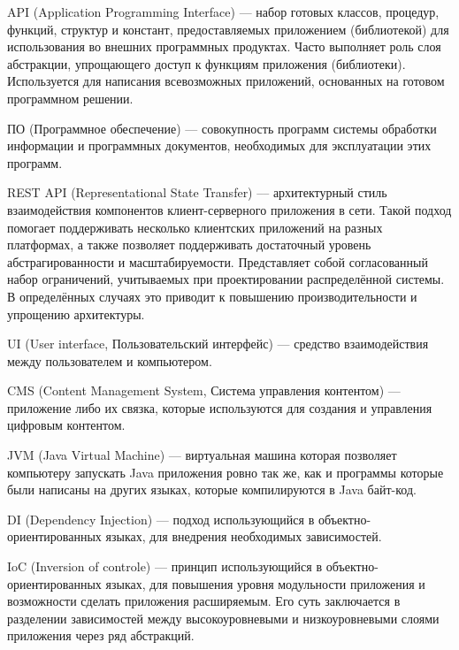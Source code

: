 \indent

\hypertarget{gloss:api}{
    API (Application Programming Interface) --- набор готовых классов, процедур, функций, структур и констант, предоставляемых приложением (библиотекой) для использования во внешних программных продуктах. 
    Часто выполняет роль слоя абстракции, упрощающего доступ к функциям приложения (библиотеки). 
    Используется для написания всевозможных приложений, основанных на готовом программном решении.\cite{api}
}

\hypertarget{gloss:software}{
    ПО (Программное обеспечение) --- совокупность программ системы обработки информации и программных документов, необходимых для эксплуатации этих программ.
}

\hypertarget{gloss:rest}{
    REST API (Representational State Transfer) --– архитектурный стиль взаимодействия компонентов клиент-серверного приложения в сети.
    Такой подход помогает поддерживать несколько клиентских приложений на разных платформах, а также позволяет поддерживать достаточный уровень абстрагированности и масштабируемости.
    Представляет собой согласованный набор ограничений, учитываемых при проектировании распределённой системы.
    В определённых случаях это приводит к повышению производительности и упрощению архитектуры.
}

\hypertarget{gloss:ui}{
    UI (User interface, Пользовательский интерфейс) --- средство взаимодействия между пользователем и компьютером.
}

\hypertarget{gloss:cms}{
    CMS (Content Management System, Система управления контентом) --- приложение либо их связка, которые используются для создания и управления цифровым контентом.
}

\hypertarget{gloss:jvm}{
    JVM (Java Virtual Machine) --- виртуальная машина которая позволяет компьютеру запускать Java приложения ровно так же, как и программы которые были написаны на других языках, которые компилируются в Java байт-код.\cite{jvm}
}

\hypertarget{gloss:di}{
    DI (Dependency Injection) --- подход использующийся в объектно-ориентированных языках, для внедрения необходимых зависимостей.
}

\hypertarget{gloss:ioc}{
    IoC (Inversion of controle) --- принцип использующийся в объектно-ориентированных языках, для повышения уровня модульности приложения и возможности сделать приложения расширяемым. 
    Его суть заключается в разделении зависимостей между высокоуровневыми и низкоуровневыми слоями приложения через ряд абстракций.
}

